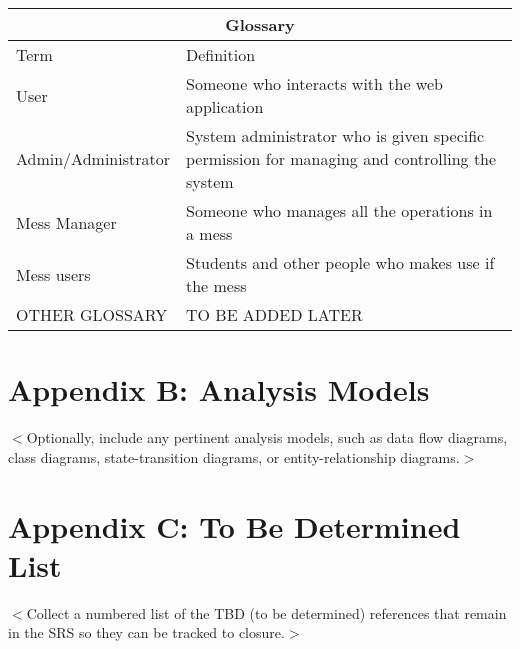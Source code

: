 \documentclass{scrreprt}
\begin{document}
\begin{tabular}{ |p{4cm}||p{12cm}| }
 \hline
 \multicolumn{2}{|c|}{Glossary} \\
 \hline
 Term & Definition\\
 \hline
 User  & Someone who interacts with the web application  \\
 Admin/Administrator&  System administrator who is given specific permission for managing and 
controlling the system  \\
 Mess Manager & Someone who manages all the operations in a mess  \\
 Mess users & Students and other people who makes use if the mess  \\
 OTHER GLOSSARY  & TO BE ADDED LATER\\

 \hline
\end{tabular}
\section{Appendix B: Analysis Models}
$<$Optionally, include any pertinent analysis models, such as data flow 
diagrams, class diagrams, state-transition diagrams, or entity-relationship 
diagrams.$>$

\section{Appendix C: To Be Determined List}
$<$Collect a numbered list of the TBD (to be determined) references that remain 
in the SRS so they can be tracked to closure.$>$
\end{document}
